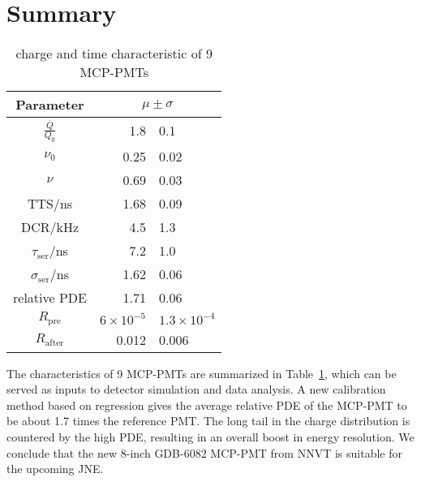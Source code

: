 \section{Summary}
\label{Summary}
\begin{table}
    \centering
    \caption{charge and time characteristic of 9 MCP-PMTs}
    \label{tab:summary}
    \begin{tabular}{c| r @{$\pm$} l}
        Parameter&\multicolumn{2}{c}{$\mu\pm\sigma$}\\
        \hline
        $\frac{\overline{Q}}{Q_0}$&1.8&0.1\\
        $\nu_0$&0.25&0.02\\
        $\nu$&0.69&0.03\\
        TTS/ns&1.68&0.09\\
        DCR/kHz&4.5&1.3\\
        $\tau_{\mathrm{ser}}$/ns&7.2&1.0\\
        $\sigma_{\mathrm{ser}}$/ns&1.62&0.06\\
        relative PDE&1.71&0.06\\
        $R_{\mathrm{pre}}$&$6\times10^{-5}$&$1.3\times10^{-4}$\\
        $R_{\mathrm{after}}$&0.012&0.006\\
        \hline
    \end{tabular}
\end{table}

The characteristics of 9 MCP-PMTs are summarized in Table~\ref{tab:summary}, which can be served as inputs to detector simulation and data analysis. A new calibration method based on regression gives the average relative PDE of the MCP-PMT to be about 1.7 times the reference PMT. The long tail in the charge distribution is countered by the high PDE, resulting in an overall boost in energy resolution. We conclude that the new 8-inch GDB-6082 MCP-PMT from NNVT is suitable for the upcoming JNE.
